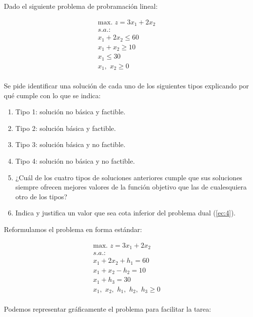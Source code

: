 Dado el siguiente problema de probramación lineal:


\begin{equation}
\begin{split}
\mbox{max. } z = 3x_1 + 2x_2\\
s.a.:\\
x_1 + 2x_2 \leq 60\\
x_1 + x_2 \geq 10\\
x_1 \leq 30\\
x_1,\,\,x_2\geq 0\\
\end{split}
\end{equation}

Se pide identificar una solución de cada uno de los siguientes tipos explicando por qué cumple con lo que se indica:
\begin{enumerate}
    \item Tipo 1: solución no básica y factible.
    \item Tipo 2: solución básica y factible.
    \item Tipo 3: solución básica y no factible.
    \item Tipo 4: solución no básica y no factible.
    \item ¿Cuál de los cuatro tipos de soluciones anteriores cumple que sus soluciones siempre ofrecen mejores valores de la función objetivo que las de cualesquiera otro de los tipos?
    \item Indica y justifica un valor que sea cota inferior del problema dual (\ref{ec:4}).

\end{enumerate}

Reformulamos el problema en forma estándar:

\begin{equation}
\begin{split}
\mbox{max. } z = 3x_1 + 2x_2\\
s.a.:\\
x_1 + 2x_2 + h_1 = 60\\
x_1 + x_2 - h_2 = 10\\
x_1 + h_3 = 30\\
x_1,\,\,x_2,\,\,h_1,\,\,h_2,\,\,h_3\geq 0\\
\end{split}
\end{equation}

Podemos representar gráficamente el problema para facilitar la tarea:

